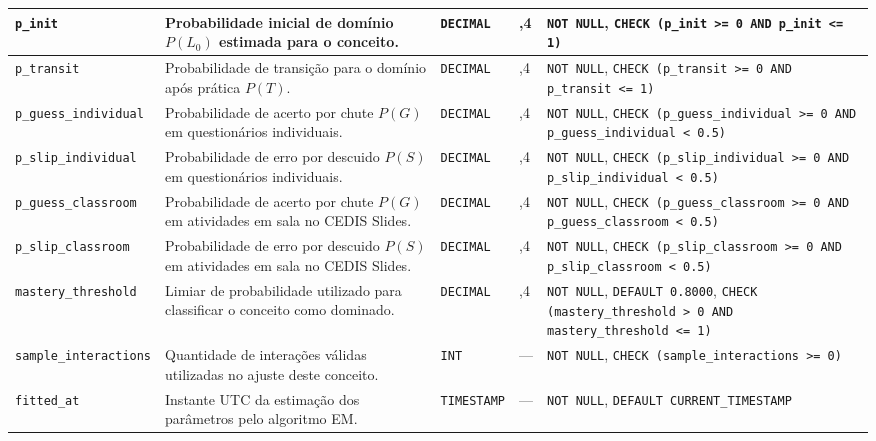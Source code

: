 \begin{anexosenv}
{\begin{longtable}{>{\raggedright\arraybackslash}p{3.0cm}>{\raggedright\arraybackslash}p{4.9cm}>{\raggedright\arraybackslash}p{1.75cm}>{\centering\arraybackslash}p{0.95cm}>{\raggedright\arraybackslash}p{3.7cm}}
\hline
\texttt{p\_\allowbreak init} & Probabilidade inicial de domínio $P(L_0)$ estimada para o conceito. & \texttt{DECIMAL} & 5,4 & \texttt{NOT NULL}, \texttt{CHECK (p\_\allowbreak init >= 0 AND p\_\allowbreak init <= 1)} \\
\hline
\texttt{p\_\allowbreak transit} & Probabilidade de transição para o domínio após prática $P(T)$. & \texttt{DECIMAL} & 5,4 & \texttt{NOT NULL}, \texttt{CHECK (p\_\allowbreak transit >= 0 AND p\_\allowbreak transit <= 1)} \\
\hline
\texttt{p\_\allowbreak guess\_\allowbreak individual} & Probabilidade de acerto por chute $P(G)$ em questionários individuais. & \texttt{DECIMAL} & 5,4 & \texttt{NOT NULL}, \texttt{CHECK (p\_\allowbreak guess\_\allowbreak individual >= 0 AND p\_\allowbreak guess\_\allowbreak individual < 0.5)} \\
\hline
\texttt{p\_\allowbreak slip\_\allowbreak individual} & Probabilidade de erro por descuido $P(S)$ em questionários individuais. & \texttt{DECIMAL} & 5,4 & \texttt{NOT NULL}, \texttt{CHECK (p\_\allowbreak slip\_\allowbreak individual >= 0 AND p\_\allowbreak slip\_\allowbreak individual < 0.5)} \\
\hline
\texttt{p\_\allowbreak guess\_\allowbreak classroom} & Probabilidade de acerto por chute $P(G)$ em atividades em sala no CEDIS Slides. & \texttt{DECIMAL} & 5,4 & \texttt{NOT NULL}, \texttt{CHECK (p\_\allowbreak guess\_\allowbreak classroom >= 0 AND p\_\allowbreak guess\_\allowbreak classroom < 0.5)} \\
\hline
\texttt{p\_\allowbreak slip\_\allowbreak classroom} & Probabilidade de erro por descuido $P(S)$ em atividades em sala no CEDIS Slides. & \texttt{DECIMAL} & 5,4 & \texttt{NOT NULL}, \texttt{CHECK (p\_\allowbreak slip\_\allowbreak classroom >= 0 AND p\_\allowbreak slip\_\allowbreak classroom < 0.5)} \\
\hline
\texttt{mastery\_\allowbreak threshold} & Limiar de probabilidade utilizado para classificar o conceito como dominado. & \texttt{DECIMAL} & 5,4 & \texttt{NOT NULL}, \texttt{DEFAULT 0.8000}, \texttt{CHECK (mastery\_\allowbreak threshold > 0 AND mastery\_\allowbreak threshold <= 1)} \\
\hline
\texttt{sample\_\allowbreak interactions} & Quantidade de interações válidas utilizadas no ajuste deste conceito. & \texttt{INT} & --- & \texttt{NOT NULL}, \texttt{CHECK (sample\_\allowbreak interactions >= 0)} \\
\hline
\texttt{fitted\_\allowbreak at} & Instante UTC da estimação dos parâmetros pelo algoritmo EM. & \texttt{TIMESTAMP} & --- & \texttt{NOT NULL}, \texttt{DEFAULT CURRENT\_\allowbreak TIMESTAMP} \\
\hline
\end{longtable}

}
\end{anexosenv}
